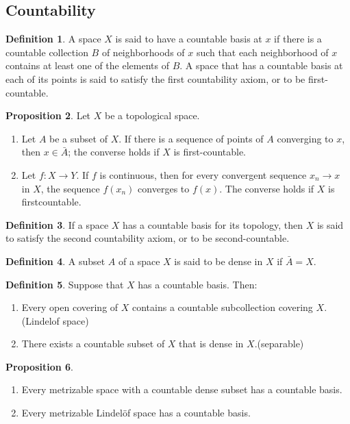 \documentclass[12pt,a4paper]{book}
\newenvironment{enu}{\begin{enumerate}[(1)]}{\end{enumerate}}
\theoremstyle{definition}
\newtheorem{defn}{Definition}[section]
\newtheorem{prop}[defn]{Proposition}
\begin{document}
\subsection{Countability}
\begin{defn}
    A space $X$ is said to have a countable basis at $x$ if there is a countable collection $B$ of neighborhoods of $x$ such that each neighborhood of $x$ contains at least one of the elements of $B$. A space that has a countable basis at each of its points is said to satisfy the first countability axiom,
    or to be first-countable.
\end{defn}
\begin{prop}
    Let $X$ be a topological space.
    \begin{enu}
        \item Let $A$ be a subset of $X$. If there is a sequence of points of $A$ converging to $x$, then $x \in \bar{A}$; the converse holds if $X$ is first-countable.
        \item Let $f: X \rightarrow Y$. If $f$ is continuous, then for every convergent sequence $x_n \rightarrow x$ in $X$, the sequence $f\left(x_n\right)$ converges to $f(x)$. The converse holds if $X$ is firstcountable.
    \end{enu}
\end{prop}
\begin{defn}
    If a space $X$ has a countable basis for its topology, then $X$ is said to satisfy the second countability axiom, or to be second-countable.
\end{defn}
\begin{defn}
    A subset $A$ of a space $X$ is said to be dense in $X$ if $\bar{A}=X$.
\end{defn}
\begin{defn}
    Suppose that $X$ has a countable basis. Then:
    \begin{enu}
        \item Every open covering of $X$ contains a countable subcollection covering $X$.(Lindelof space)
        \item There exists a countable subset of $X$ that is dense in $X$.(separable)
    \end{enu}
\end{defn}
\begin{prop}
    \begin{enu}
        \item Every metrizable space with a countable dense subset has a countable basis.
        \item Every metrizable Lindelöf space has a countable basis.
    \end{enu}
\end{prop}
\end{document}
